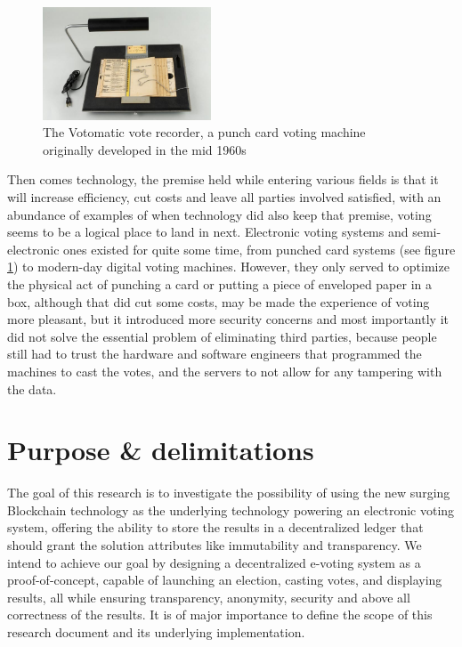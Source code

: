 \begin{figure}
	\vspace{-10pt}
	\includegraphics[width=5cm]{images/chapter1/votomatic.jpg}
	\vspace{-10pt}
	\caption{{\footnotesize The Votomatic vote recorder, a punch card voting machine originally developed in the mid 1960s}}
	\label{votomatic}
\end{figure}

Then comes technology, the premise held while entering various fields is that it will increase efficiency, cut costs and leave all parties involved satisfied, with an abundance of examples of when technology did also keep that premise, voting seems to be a logical place to land in next. Electronic voting systems and semi-electronic ones existed for quite some time, from punched card systems {\small (see figure \ref{votomatic})} to modern-day digital voting machines. However, they only served to optimize the physical act of punching a card or putting a piece of enveloped paper in a box, although that did cut some costs, may be made the experience of voting more pleasant, but it introduced more security concerns and most importantly it did not solve the essential problem of eliminating third parties, because people still had to trust the hardware and software engineers that programmed the machines to cast the votes, and the servers to not allow for any tampering with the data.\newpage


\section{Purpose \& delimitations}
The goal of this research is to investigate the possibility of using the new surging Blockchain technology as the underlying technology powering an electronic voting system, offering the ability to store the results in a decentralized ledger that should grant the solution attributes like immutability and transparency. We intend to achieve our goal by designing a decentralized e-voting system as a \gls{proof-of-concept}, capable of launching an election, casting votes, and displaying results, all while ensuring transparency, anonymity, security and above all correctness of the results.
It is of major importance to define the scope of this research document and its underlying implementation.

